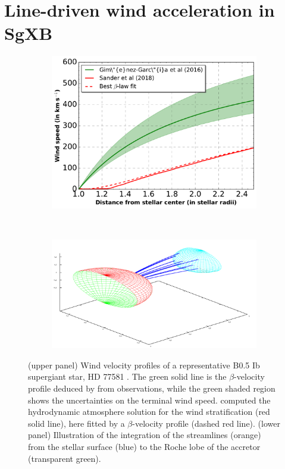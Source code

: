 \documentclass[letter]{aa}
\makeatletter
\newcommand*{\ns}{NS\@\xspace}
\makeatother
\begin{document}
\section{Line-driven wind acceleration in SgXB}
\label{sec:}

\begin{figure}
\begin{subfigure}{.5\textwidth}
\centering
\includegraphics[width=0.99\columnwidth]{Pictures/vel_prof.pdf}
  \label{fig:vel_prof}
\end{subfigure}
\phantom{p}\\
\begin{subfigure}{.5\textwidth}
\centering
\includegraphics[width=0.99\columnwidth]{Pictures/3D.png}
  \label{fig:3D}
\end{subfigure}
\caption{(upper panel) Wind velocity profiles of a representative B0.5 Ib supergiant star, HD 77581 \citep[the donor star in Vela X-1, where the accreting \ns lies at $\sim$1.8 stellar radii][]{Hiltner1972,Forman1973}. The green solid line is the $\beta$-velocity profile deduced by \cite{Gimenez-Garcia2016} from observations, while the green shaded region shows the uncertainties on the terminal wind speed. \cite{Sander2017} computed the hydrodynamic atmosphere solution for the wind stratification (red solid line), here fitted by a $\beta$-velocity profile (dashed red line). (lower panel) Illustration of the integration of the streamlines (orange) from the stellar surface (blue) to the Roche lobe of the accretor (transparent green).}
\label{fig:setup}
\end{figure} 
\end{document}
